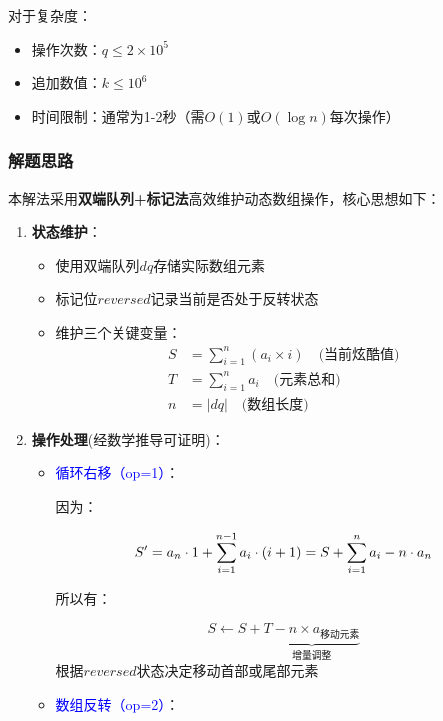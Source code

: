\documentclass[../mainReport.tex]{subfiles} %
\begin{document}
对于复杂度：

\begin{itemize}
\item 操作次数：$q \leq 2 \times 10^5$
\item 追加数值：$k \leq 10^6$
\item 时间限制：通常为1-2秒（需$O(1)$或$O(\log n)$每次操作）
\end{itemize}

\subsubsection{解题思路}
本解法采用\textbf{双端队列+标记法}高效维护动态数组操作，核心思想如下：

\begin{enumerate}
\item \textbf{状态维护}：
\begin{itemize}
\item 使用双端队列$dq$存储实际数组元素
\item 标记位$reversed$记录当前是否处于反转状态
\item 维护三个关键变量：
\begin{align*}
S &= \sum_{i=1}^n (a_i \times i) \quad \text{(当前炫酷值)} \\
T &= \sum_{i=1}^n a_i \quad \text{(元素总和)} \\
n &= |dq| \quad \text{(数组长度)}
\end{align*}
\end{itemize}

\item \textbf{操作处理}(经数学推导可证明)：
\begin{itemize}
\item \textcolor{blue}{循环右移（op=1）}：

因为：

\begin{equation*}
    S'=a_n \cdot 1 + \sum_{i=1}^{n-1}a_i\cdot(i+1)=S+\sum_{i=1}^{n}a_i-n\cdot a_n\\
\end{equation*}

所以有：

\begin{equation*}
S \leftarrow S + \underbrace{T - n \times a_{\text{移动元素}}}_{\text{增量调整}}
\end{equation*}
根据$reversed$状态决定移动首部或尾部元素

\item \textcolor{blue}{数组反转（op=2）}：


\end{itemize}
\end{enumerate}
\end{document}
